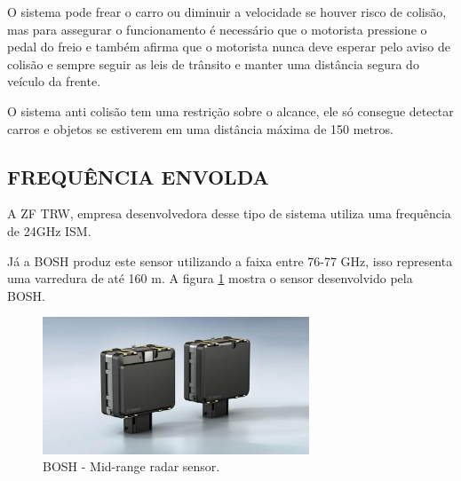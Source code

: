 O sistema pode frear o carro ou diminuir a velocidade se houver risco de colisão,
mas para assegurar o funcionamento é necessário que o motorista pressione o pedal
do freio e também afirma que o motorista nunca deve esperar pelo aviso de colisão
e sempre seguir as leis de trânsito e manter uma distância segura do veículo da
frente. \cite{8comper}

O sistema anti colisão tem uma restrição sobre o alcance, ele só consegue detectar
carros e objetos se estiverem em uma distância máxima de 150 metros. \cite{9comper}


\subsection{FREQUÊNCIA ENVOLDA}

A ZF TRW, empresa desenvolvedora desse tipo de sistema utiliza uma frequência de
24GHz ISM.

Já a BOSH produz este sensor utilizando a faixa entre 76-77 GHz,
isso representa uma varredura de até 160 m. A figura \ref{fig:bosh} mostra o
sensor desenvolvido pela BOSH.

\begin{figure}[h]
  \centering
  \includegraphics[width=300px, scale=1]{figuras/bosh}
  \caption{BOSH - Mid-range radar sensor.}
\label{fig:bosh}
\end{figure}
